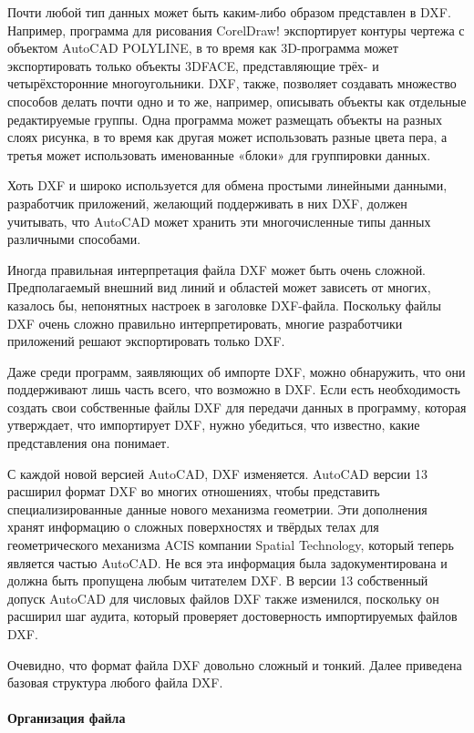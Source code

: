 Почти любой тип данных может быть каким-либо образом представлен в DXF. Например, программа для рисования CorelDraw! экспортирует контуры чертежа с объектом AutoCAD POLYLINE, в то время как 3D-программа может экспортировать только объекты 3DFACE, представляющие трёх- и четырёхсторонние многоугольники. DXF, также, позволяет создавать множество способов делать почти одно и то же, например, описывать объекты как отдельные редактируемые группы. Одна программа может размещать объекты на разных слоях рисунка, в то время как другая может использовать разные цвета пера, а третья может использовать именованные «блоки» для группировки данных.

Хоть DXF и широко используется для обмена простыми линейными данными, разработчик приложений, желающий поддерживать в них DXF, должен учитывать, что AutoCAD может хранить эти многочисленные типы данных различными способами.

Иногда правильная интерпретация файла DXF может быть очень сложной. Предполагаемый внешний вид линий и областей может зависеть от многих, казалось бы, непонятных настроек в заголовке DXF-файла. Поскольку файлы DXF очень сложно правильно интерпретировать, многие разработчики приложений решают экспортировать только DXF.

Даже среди программ, заявляющих об импорте DXF, можно обнаружить, что они поддерживают лишь часть всего, что возможно в DXF. Если есть необходимость создать свои собственные файлы DXF для передачи данных в программу, которая утверждает, что импортирует DXF, нужно убедиться, что известно, какие представления она понимает.

С каждой новой версией AutoCAD, DXF изменяется. AutoCAD версии 13 расширил формат DXF во многих отношениях, чтобы представить специализированные данные нового механизма геометрии. Эти дополнения хранят информацию о сложных поверхностях и твёрдых телах для геометрического механизма ACIS компании Spatial Technology, который теперь является частью AutoCAD. Не вся эта информация была задокументирована и должна быть пропущена любым читателем DXF. В версии 13 собственный допуск AutoCAD для числовых файлов DXF также изменился, поскольку он расширил шаг аудита, который проверяет достоверность импортируемых файлов DXF.

Очевидно, что формат файла DXF довольно сложный и тонкий. Далее приведена базовая структура любого файла DXF.

\paragraph{Организация файла}


